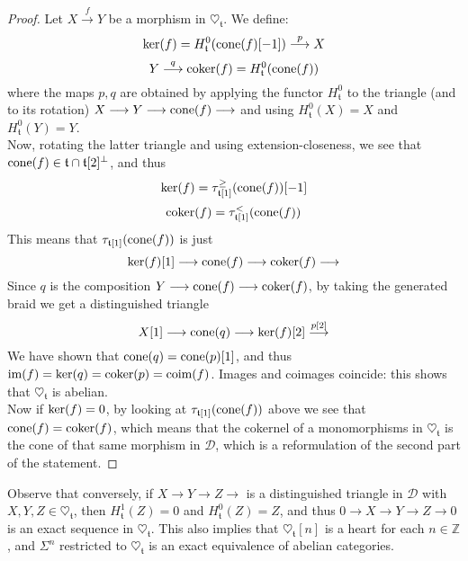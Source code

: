 \begin{proof}
Let $X \overset{f}{\longrightarrow} Y$ be a morphism in $\heartsuit_{\mathfrak{t}}$. We define: $$\textnormal{ker}(f)=H^0_{\mathfrak{t}}(\textnormal{cone}(f)[-1])  \overset{p}{\longrightarrow} X $$  $$Y \overset{q}{\longrightarrow} \textnormal{coker}(f)=H^0_{\mathfrak{t}}(\textnormal{cone}(f))$$
where the maps $p,q$ are obtained by applying the functor $H^0_{\mathfrak{t}}$ to the triangle (and to its rotation) $X \longrightarrow Y \longrightarrow \textnormal{cone}(f)  \longrightarrow$ and using $H^0_{\mathfrak{t}}(X)=X$ and $H^0_{\mathfrak{t}}(Y)=Y$. \\
Now, rotating the latter triangle and using extension-closeness, we see that $\textnormal{cone}(f) \in \mathfrak{t} \cap \mathfrak{t}[2]^{\perp}$, and thus $$\textnormal{ker}(f)=\tau^{\ge}_{\mathfrak{t}[1]}(\textnormal{cone}(f))[-1]$$ $$\textnormal{coker}(f)=\tau^{<}_{\mathfrak{t}[1]}(\textnormal{cone}(f))$$
This means that $\tau_{\mathfrak{t}[1]}(\textnormal{cone}(f))$ is just $$\textnormal{ker}(f)[1] \longrightarrow \textnormal{cone}(f) \longrightarrow \textnormal{coker}(f) \longrightarrow $$
Since $q$ is the composition $Y \longrightarrow \textnormal{cone}(f) \longrightarrow \textnormal{coker}(f)$, by taking the generated braid we get a distinguished triangle $$X[1] \longrightarrow \textnormal{cone}(q) \longrightarrow  \textnormal{ker}(f)[2] \overset{p[2]}{\longrightarrow} $$
We have shown that $\textnormal{cone}(q) = \textnormal{cone}(p)[1]$, and thus $\textnormal{im}(f)=\textnormal{ker}(q)=\textnormal{coker}(p)=\textnormal{coim}(f)$. Images and coimages coincide: this shows that $\heartsuit_{\mathfrak{t}}$ is abelian. \\
Now if $\textnormal{ker}(f)=0$, by looking at  $\tau_{\mathfrak{t}[1]}(\textnormal{cone}(f))$ above we see that $\textnormal{cone}(f)=\textnormal{coker}(f)$, which means that the cokernel of a monomorphisms in $\heartsuit_{\mathfrak{t}}$ is the cone of that same morphism in $\mathscr{D}$, which is a reformulation of the second part of the statement.
 
\end{proof}

Observe that conversely, if $X \longrightarrow Y \longrightarrow Z \longrightarrow$ is a distinguished triangle in $\mathscr{D}$ with $X,Y,Z \in \heartsuit_{\mathfrak{t}}$, then $H^1_{\mathfrak{t}}(Z)=0$ and $H^0_{\mathfrak{t}}(Z)=Z$, and thus $0 \longrightarrow X \longrightarrow Y \longrightarrow Z \longrightarrow 0$ is an exact sequence in $\heartsuit_{\mathfrak{t}}$. This also implies that $\heartsuit_{\mathfrak{t}}[n]$ is a heart for each $n \in \mathbb{Z}$, and $\Sigma^n$ restricted to $\heartsuit_{\mathfrak{t}}$ is an exact equivalence of abelian categories. \\

